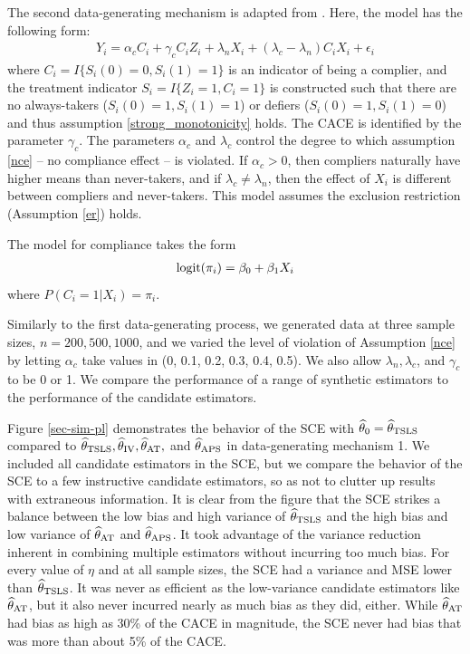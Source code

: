 \documentclass{article}
\def\siv{_{\text{IV}}}
\def\sat{_{\text{AT}}}
\def\stsls{_{\text{TSLS}}}
\def\saps{_{\text{APS}}}
\begin{document}
The second data-generating mechanism is adapted from \citep{stuart2015assessing}. Here, the model has the following form:
\begin{align}
Y_i = \alpha_c C_i + \gamma_cC_iZ_i + \lambda_n X_i + (\lambda_c - \lambda_n)C_iX_i + \epsilon_i
\end{align}
where $C_i = I\{S_i(0) = 0, S_i(1) = 1\}$ is an indicator of being a complier, and the treatment indicator $S_i = I\{Z_i = 1, C_i = 1\}$ is constructed such that there are no always-takers ($S_i(0) = 1, S_i(1) = 1$) or defiers ($S_i(0) = 1, S_i(1) = 0$) and thus assumption \ref{strong_monotonicity} holds. The CACE is identified by the parameter $\gamma_c$. The parameters $\alpha_c$ and $\lambda_c$ control the degree to which assumption \ref{nce} -- no compliance effect -- is violated. If $\alpha_c > 0$, then compliers naturally have higher means than never-takers, and if $\lambda_c \neq \lambda_n$, then the effect of $X_i$ is different between compliers and never-takers. This model assumes the exclusion restriction (Assumption \ref{er}) holds.

The model for compliance takes the form
\begin{align}
\mbox{logit}(\pi_i) = \beta_0 + \beta_1X_i
\end{align}
where $P(C_i = 1 | X_i) = \pi_i$.

Similarly to the first data-generating process, we generated data at three sample sizes, $n = 200, 500, 1000$, and we varied the level of violation of Assumption \ref{nce} by letting $\alpha_c$ take values in (0, 0.1, 0.2, 0.3, 0.4, 0.5).  We also allow $\lambda_n, \lambda_c$, and $\gamma_c$ to be 0 or 1. We compare the performance of a range of synthetic estimators to the performance of the candidate estimators.

Figure \ref{sec-sim-pl} demonstrates the behavior of the SCE with $\thetahat_0 = \thetahat\stsls$ compared to $\thetahat\stsls, \thetahat\siv, \thetahat\sat,$ and $\thetahat\saps$ in data-generating mechanism 1. We included all candidate estimators in the SCE, but we compare the behavior of the SCE to a few instructive candidate estimators, so as not to clutter up results with extraneous information.  It is clear from the figure that the SCE strikes a balance between the low bias and high variance of $\thetahat\stsls$ and the high bias and low variance of $\thetahat\sat$ and $\thetahat\saps$. It took advantage of the variance reduction inherent in combining multiple estimators without incurring too much bias. For every value of $\eta$ and at all sample sizes, the SCE had a variance and MSE lower than $\thetahat\stsls$. It was never as efficient as the low-variance candidate estimators like $\thetahat\sat$, but it also never incurred nearly as much bias as they did, either. While $\thetahat\sat$ had bias as high as 30\% of the CACE in magnitude, the SCE never had bias that was more than about 5\% of the CACE.
\end{document}
